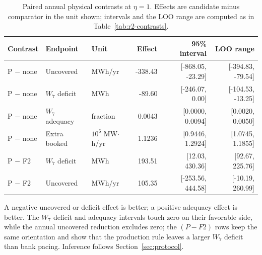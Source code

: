 \begin{table}[!tbp]
\centering
\caption{Paired annual physical contrasts at $\eta=1$. Effects are candidate minus comparator in the unit shown; intervals and the LOO range are computed as in Table~\ref{tab:r2-contrasts}.}
\label{tab:r2-physical-contrasts}
\scriptsize
\setlength{\tabcolsep}{3pt}
\begin{tabular}{@{}lllrrr@{}}
\toprule
Contrast & Endpoint & Unit & Effect & 95\% interval & LOO range \\
\midrule
P $-$ none & Uncovered & MWh/yr & -338.43 & [-868.05, -23.29] & [-394.83, -79.54] \\
P $-$ none & $W_7$ deficit & MWh & -89.60 & [-246.07, 0.00] & [-104.53, -13.25] \\
P $-$ none & $W_7$ adequacy & fraction & 0.0043 & [0.0000, 0.0094] & [0.0020, 0.0050] \\
P $-$ none & Extra booked & $10^6$ MW$\cdot$h/yr & 1.1236 & [0.9446, 1.2924] & [1.0745, 1.1855] \\
P $-$ F2 & $W_7$ deficit & MWh & 193.51 & [12.03, 430.36] & [92.67, 225.76] \\
P $-$ F2 & Uncovered & MWh/yr & 105.35 & [-253.56, 444.58] & [-10.19, 260.99] \\
\bottomrule
\end{tabular}
\par\footnotesize A negative uncovered or deficit effect is better; a positive adequacy effect is better. The $W_7$ deficit and adequacy intervals touch zero on their favorable side, while the annual uncovered reduction excludes zero; the $(P-F2)$ rows keep the same orientation and show that the production rule leaves a larger $W_7$ deficit than bank pacing. Inference follows Section~\ref{sec:protocol}.
\end{table}
